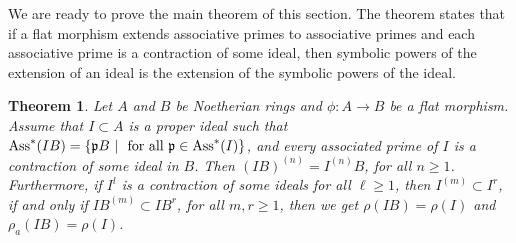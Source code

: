 \documentclass[12pt]{amsart}
\numberwithin{equation}{section}
\newtheorem{theorem}{Theorem}[section]
\theoremstyle{definition}
\DeclareMathOperator{\Ass}{Ass}
\def\pp{{\frak p}}
\begin{document}
We are ready to prove the main theorem of this section.  The theorem states that if a flat morphism extends associative primes to associative primes and each associative prime is a contraction of some ideal, then symbolic powers of the extension of an ideal is the extension of the symbolic powers of the ideal. 

\begin{theorem} \label{theorem: symbolic powers under flat extension}Let $A$ and $B$ be Noetherian rings  and $\phi: A\to B$ be a flat morphism. Assume that $I\subset A$ is a proper ideal such that $\Ass^*(IB)=\{\pp B~|~ \text{ for all } \pp\in \Ass^*(I) \}$, and every associated prime of $I$ is a contraction of some ideal in $B$. Then $(IB)^{(n)} = I^{(n)}B $, for all $n \geqslant 1$.   Furthermore, if $I^l$ is a contraction of some ideals for all $\ell\geqslant 1$, then $I^{(m)} \subset I^r$, if and only if $ IB^{(m)} \subset IB^r$, for all $m,r \geqslant 1$, then we get $\rho(IB)=\rho(I)$ and $\rho_a(IB)=\rho(I)$. 
\end{theorem}
\end{document}
